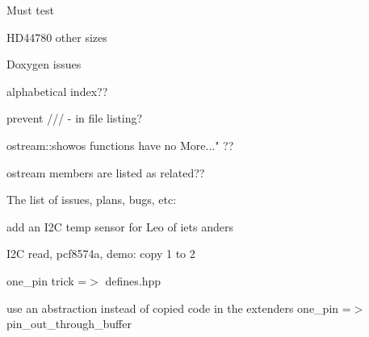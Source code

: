 Must test
\begin{DoxyItemize}
\item H\+D44780 other sizes
\end{DoxyItemize}

Doxygen issues
\begin{DoxyItemize}
\item alphabetical index??
\item prevent /// -\/ in file listing?
\item ostream\+::showos \textquotesingle{}functions\textquotesingle{} have no \textquotesingle{}More..." ??
\item ostream members are listed as related??
\end{DoxyItemize}

The list of issues, plans, bugs, etc\+:
\begin{DoxyItemize}
\item add an I2C temp sensor for Leo of iets anders
\item I2C read, pcf8574a, demo\+: copy 1 to 2
\item one\+\_\+pin trick =$>$ defines.\+hpp
\item use an abstraction instead of copied code in the extenders one\+\_\+pin =$>$ pin\+\_\+out\+\_\+through\+\_\+buffer 
\end{DoxyItemize}
